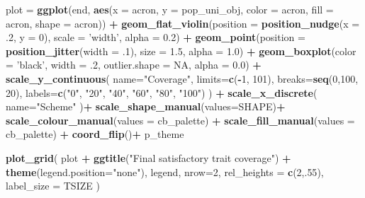 \documentclass[]{book}
\newenvironment{Shaded}{\begin{snugshade}}{\end{snugshade}}
\newcommand{\DataTypeTok}[1]{\textcolor[rgb]{0.13,0.29,0.53}{#1}}
\newcommand{\DecValTok}[1]{\textcolor[rgb]{0.00,0.00,0.81}{#1}}
\newcommand{\FloatTok}[1]{\textcolor[rgb]{0.00,0.00,0.81}{#1}}
\newcommand{\KeywordTok}[1]{\textcolor[rgb]{0.13,0.29,0.53}{\textbf{#1}}}
\newcommand{\NormalTok}[1]{#1}
\newcommand{\OperatorTok}[1]{\textcolor[rgb]{0.81,0.36,0.00}{\textbf{#1}}}
\newcommand{\OtherTok}[1]{\textcolor[rgb]{0.56,0.35,0.01}{#1}}
\newcommand{\StringTok}[1]{\textcolor[rgb]{0.31,0.60,0.02}{#1}}
\begin{document}
\begin{Shaded}
\begin{Highlighting}[]
\NormalTok{plot =}\StringTok{ }\KeywordTok{ggplot}\NormalTok{(end, }\KeywordTok{aes}\NormalTok{(}\DataTypeTok{x =}\NormalTok{ acron, }\DataTypeTok{y =}\NormalTok{ pop_uni_obj, }\DataTypeTok{color =}\NormalTok{ acron, }\DataTypeTok{fill =}\NormalTok{ acron, }\DataTypeTok{shape =}\NormalTok{ acron)) }\OperatorTok{+}
\StringTok{  }\KeywordTok{geom_flat_violin}\NormalTok{(}\DataTypeTok{position =} \KeywordTok{position_nudge}\NormalTok{(}\DataTypeTok{x =} \FloatTok{.2}\NormalTok{, }\DataTypeTok{y =} \DecValTok{0}\NormalTok{), }\DataTypeTok{scale =} \StringTok{'width'}\NormalTok{, }\DataTypeTok{alpha =} \FloatTok{0.2}\NormalTok{) }\OperatorTok{+}
\StringTok{  }\KeywordTok{geom_point}\NormalTok{(}\DataTypeTok{position =} \KeywordTok{position_jitter}\NormalTok{(}\DataTypeTok{width =} \FloatTok{.1}\NormalTok{), }\DataTypeTok{size =} \FloatTok{1.5}\NormalTok{, }\DataTypeTok{alpha =} \FloatTok{1.0}\NormalTok{) }\OperatorTok{+}
\StringTok{  }\KeywordTok{geom_boxplot}\NormalTok{(}\DataTypeTok{color =} \StringTok{'black'}\NormalTok{, }\DataTypeTok{width =} \FloatTok{.2}\NormalTok{, }\DataTypeTok{outlier.shape =} \OtherTok{NA}\NormalTok{, }\DataTypeTok{alpha =} \FloatTok{0.0}\NormalTok{) }\OperatorTok{+}
\StringTok{  }\KeywordTok{scale_y_continuous}\NormalTok{(}
    \DataTypeTok{name=}\StringTok{"Coverage"}\NormalTok{,}
    \DataTypeTok{limits=}\KeywordTok{c}\NormalTok{(}\OperatorTok{-}\DecValTok{1}\NormalTok{, }\DecValTok{101}\NormalTok{),}
    \DataTypeTok{breaks=}\KeywordTok{seq}\NormalTok{(}\DecValTok{0}\NormalTok{,}\DecValTok{100}\NormalTok{, }\DecValTok{20}\NormalTok{),}
    \DataTypeTok{labels=}\KeywordTok{c}\NormalTok{(}\StringTok{"0"}\NormalTok{, }\StringTok{"20"}\NormalTok{, }\StringTok{"40"}\NormalTok{, }\StringTok{"60"}\NormalTok{, }\StringTok{"80"}\NormalTok{, }\StringTok{"100"}\NormalTok{)}
\NormalTok{  ) }\OperatorTok{+}
\StringTok{  }\KeywordTok{scale_x_discrete}\NormalTok{(}
    \DataTypeTok{name=}\StringTok{"Scheme"}
\NormalTok{  )}\OperatorTok{+}
\StringTok{  }\KeywordTok{scale_shape_manual}\NormalTok{(}\DataTypeTok{values=}\NormalTok{SHAPE)}\OperatorTok{+}
\StringTok{  }\KeywordTok{scale_colour_manual}\NormalTok{(}\DataTypeTok{values =}\NormalTok{ cb_palette) }\OperatorTok{+}
\StringTok{  }\KeywordTok{scale_fill_manual}\NormalTok{(}\DataTypeTok{values =}\NormalTok{ cb_palette) }\OperatorTok{+}
\StringTok{  }\KeywordTok{coord_flip}\NormalTok{()}\OperatorTok{+}
\StringTok{  }\NormalTok{p_theme}

\KeywordTok{plot_grid}\NormalTok{(}
\NormalTok{  plot }\OperatorTok{+}
\StringTok{    }\KeywordTok{ggtitle}\NormalTok{(}\StringTok{"Final satisfactory trait coverage"}\NormalTok{) }\OperatorTok{+}
\StringTok{    }\KeywordTok{theme}\NormalTok{(}\DataTypeTok{legend.position=}\StringTok{"none"}\NormalTok{),}
\NormalTok{  legend,}
  \DataTypeTok{nrow=}\DecValTok{2}\NormalTok{,}
  \DataTypeTok{rel_heights =} \KeywordTok{c}\NormalTok{(}\DecValTok{2}\NormalTok{,.}\DecValTok{55}\NormalTok{),}
  \DataTypeTok{label_size =}\NormalTok{ TSIZE}
\NormalTok{)}
\end{Highlighting}
\end{Shaded}
\end{document}
